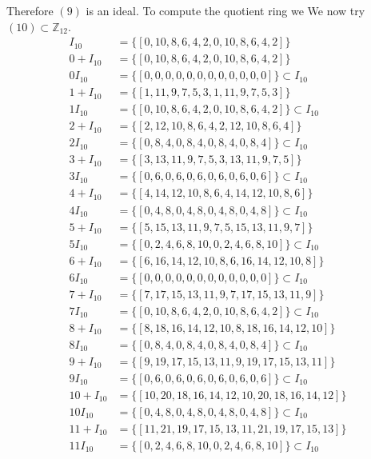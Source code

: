 \documentclass[11pt]{amsart}
\begin{document}
Therefore $(9)$ is an ideal.
To compute the quotient ring we
We now try $(10) \subset \mathbb{Z}_{12}$.
\begin{equation*}
\begin{aligned}
I_10 &= \{[0, 10, 8, 6, 4, 2, 0, 10, 8, 6, 4, 2]\} \\
0+ I_10 &= \{[0, 10, 8, 6, 4, 2, 0, 10, 8, 6, 4, 2]\}\\
0 I_10 &= \{[0, 0, 0, 0, 0, 0, 0, 0, 0, 0, 0, 0]\} \subset I_10 \\
1+ I_10 &= \{[1, 11, 9, 7, 5, 3, 1, 11, 9, 7, 5, 3]\}\\
1 I_10 &= \{[0, 10, 8, 6, 4, 2, 0, 10, 8, 6, 4, 2]\} \subset I_10 \\
2+ I_10 &= \{[2, 12, 10, 8, 6, 4, 2, 12, 10, 8, 6, 4]\}\\
2 I_10 &= \{[0, 8, 4, 0, 8, 4, 0, 8, 4, 0, 8, 4]\} \subset I_10 \\
3+ I_10 &= \{[3, 13, 11, 9, 7, 5, 3, 13, 11, 9, 7, 5]\}\\
3 I_10 &= \{[0, 6, 0, 6, 0, 6, 0, 6, 0, 6, 0, 6]\} \subset I_10 \\
4+ I_10 &= \{[4, 14, 12, 10, 8, 6, 4, 14, 12, 10, 8, 6]\}\\
4 I_10 &= \{[0, 4, 8, 0, 4, 8, 0, 4, 8, 0, 4, 8]\} \subset I_10 \\
5+ I_10 &= \{[5, 15, 13, 11, 9, 7, 5, 15, 13, 11, 9, 7]\}\\
5 I_10 &= \{[0, 2, 4, 6, 8, 10, 0, 2, 4, 6, 8, 10]\} \subset I_10 \\
6+ I_10 &= \{[6, 16, 14, 12, 10, 8, 6, 16, 14, 12, 10, 8]\}\\
6 I_10 &= \{[0, 0, 0, 0, 0, 0, 0, 0, 0, 0, 0, 0]\} \subset I_10 \\
7+ I_10 &= \{[7, 17, 15, 13, 11, 9, 7, 17, 15, 13, 11, 9]\}\\
7 I_10 &= \{[0, 10, 8, 6, 4, 2, 0, 10, 8, 6, 4, 2]\} \subset I_10 \\
8+ I_10 &= \{[8, 18, 16, 14, 12, 10, 8, 18, 16, 14, 12, 10]\}\\
8 I_10 &= \{[0, 8, 4, 0, 8, 4, 0, 8, 4, 0, 8, 4]\} \subset I_10 \\
9+ I_10 &= \{[9, 19, 17, 15, 13, 11, 9, 19, 17, 15, 13, 11]\}\\
9 I_10 &= \{[0, 6, 0, 6, 0, 6, 0, 6, 0, 6, 0, 6]\} \subset I_10 \\
10+ I_10 &= \{[10, 20, 18, 16, 14, 12, 10, 20, 18, 16, 14, 12]\}\\
10 I_10 &= \{[0, 4, 8, 0, 4, 8, 0, 4, 8, 0, 4, 8]\} \subset I_10 \\
11+ I_10 &= \{[11, 21, 19, 17, 15, 13, 11, 21, 19, 17, 15, 13]\}\\
11 I_10 &= \{[0, 2, 4, 6, 8, 10, 0, 2, 4, 6, 8, 10]\} \subset I_10 \\
\end{aligned}
\end{equation*}
\end{document}
